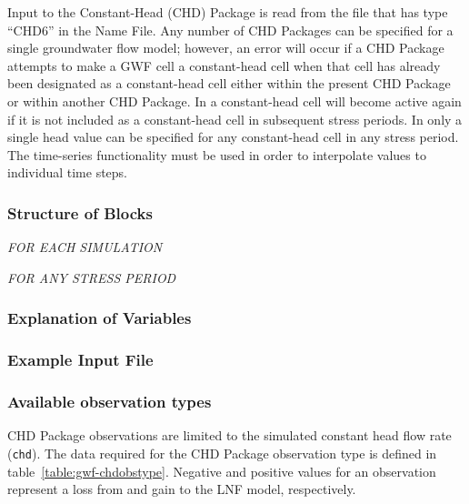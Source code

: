 
Input to the Constant-Head (CHD) Package is read from the file that has type ``CHD6'' in the Name File.  Any number of CHD Packages can be specified for a single groundwater flow model; however, an error will occur if a CHD Package attempts to make a GWF cell a constant-head cell when that cell has already been designated as a constant-head cell either within the present CHD Package or within another CHD Package. In \mf a constant-head cell will become active again if it is not included as a constant-head cell in subsequent stress periods. In \mf only a single head value can be specified for any constant-head cell in any stress period.  The time-series functionality must be used in order to interpolate values to individual time steps.

\vspace{5mm}
\subsubsection{Structure of Blocks}
\vspace{5mm}

\noindent \textit{FOR EACH SIMULATION}


\vspace{5mm}
\noindent \textit{FOR ANY STRESS PERIOD}

\packageperioddescription

\vspace{5mm}
\subsubsection{Explanation of Variables}
\begin{description}

\end{description}

\vspace{5mm}
\subsubsection{Example Input File}


\vspace{5mm}
\subsubsection{Available observation types}
CHD Package observations are limited to the simulated constant head flow rate (\texttt{chd}). The data required for the CHD Package observation type is defined in table~\ref{table:gwf-chdobstype}. Negative and positive values for an observation represent a loss from and gain to the LNF model, respectively.

